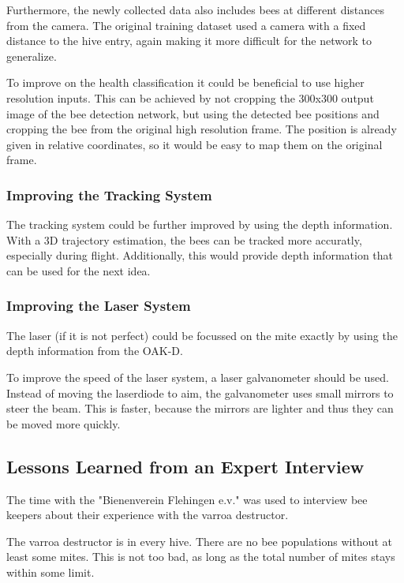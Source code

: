 \documentclass[a4paper,titlepage]{article}
\begin{document}
Furthermore, the newly collected data also includes bees at different distances from the camera.
The original training dataset used a camera with a fixed distance to the hive entry, again making it more difficult for the network to generalize.

To improve on the health classification it could be beneficial to use higher resolution inputs.
This can be achieved by not cropping the 300x300 output image of the bee detection network, but using the detected bee positions and cropping the bee from the original high resolution frame.
The position is already given in relative coordinates, so it would be easy to map them on the original frame.

\subsubsection{Improving the Tracking System}

The tracking system could be further improved by using the depth information.
With a 3D trajectory estimation, the bees can be tracked more accuratly, especially during flight.
Additionally, this would provide depth information that can be used for the next idea.

\subsubsection{Improving the Laser System}

The laser (if it is not perfect) could be focussed on the mite exactly by using the depth information from the OAK-D.

To improve the speed of the laser system, a laser galvanometer should be used.
Instead of moving the laserdiode to aim, the galvanometer uses small mirrors to steer the beam.
This is faster, because the mirrors are lighter and thus they can be moved more quickly.

\subsection{Lessons Learned from an Expert Interview}

The time with the "Bienenverein Flehingen e.v." was used to interview bee keepers about their experience with the varroa destructor.

The varroa destructor is in every hive.
There are no bee populations without at least some mites.
This is not too bad, as long as the total number of mites stays within some limit.
\end{document}

